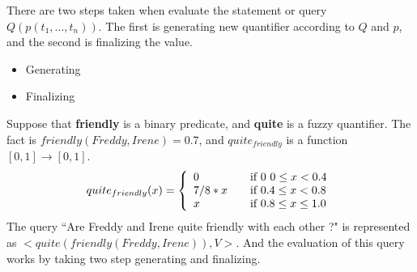 There are two steps taken when evaluate the statement or query $Q(p(t_1,...,t_n))$. The first is generating new quantifier according to $Q$ and $p$, and the second is finalizing the value.

\begin{itemize}
\item Generating

\item Finalizing

\end{itemize}

\begin{ex}
Suppose that \textbf{friendly} is a binary predicate, and \textbf{quite} is a fuzzy quantifier. The fact is 
$friendly(Freddy,Irene)=0.7$, and $quite_{friendly}$ is a function $[0,1] \rightarrow [0,1]$.
\[  quite_{friendly}(x) = \left\{ 
  \begin{array}{l l}
    0 & \quad \text{if 0 $0 \leq x < 0.4$}\\
    7/8*x & \quad \text{if $0.4 \leq x < 0.8$}\\
    x & \quad \text{if $0.8 \leq x \leq 1.0$}\\
  \end{array} \right.
\]
The query ``Are Freddy and Irene quite friendly with each other ?" is represented as $<quite(friendly(Freddy, Irene)),V>$. And the evaluation of this query works by taking two step generating and finalizing.

\end{ex}

